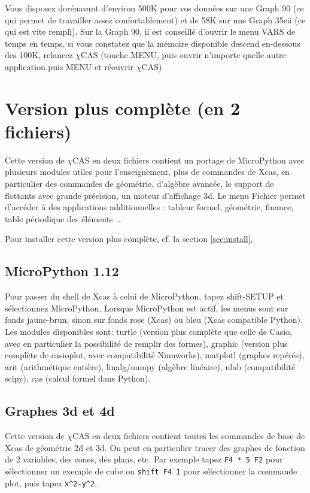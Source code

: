 \documentclass{article}
\begin{document}
\begin{giacjshere}
Vous disposez dor\'enavant d'environ 500K pour vos donn\'ees sur une Graph 90
(ce qui permet de travailler assez confortablement)
et de 58K sur une Graph 35eii (ce qui est vite rempli).
Sur la Graph 90, il est conseill\'e d'ouvrir le menu VARS de temps
en temps, si vous constatez que la m\'emoire disponible descend en-dessous
des 100K, relancez $\chi$CAS (touche MENU, puis ouvrir n'importe
quelle autre application puis MENU et r\'eouvrir $\chi$CAS).

\section{Version plus compl\`ete (en 2 fichiers)} \label{sec:2}
Cette version de $\chi$CAS en deux fichiers contient un portage de
MicroPython avec plusieurs modules utiles pour l'enseignement, plus de 
commandes de Xcas, en particulier des commandes de g\'eom\'etrie,
d'alg\`ebre avanc\'ee, le support de flottants avec grande
pr\'ecision, un moteur d'affichage 3d. Le menu Fichier permet d'acc\'eder
\`a des applications additionnelles : tableur formel, géométrie,
finance, table p\'eriodique des \'el\'ements ...

Pour installer cette version plus compl\`ete, cf. la section
\ref{sec:install}. 

\subsection{MicroPython 1.12}
Pour passer du shell de Xcas \`a celui de MicroPython, tapez
shift-SETUP et s\'electionnez MicroPython. 
Lorsque MicroPython est actif, les menus sont sur fonds
jaune-brun, sinon sur fonds rose (Xcas) ou bleu (Xcas compatible Python).
Les modules disponibles sont: turtle (version plus compl\`ete que
celle de Casio, avec en particulier la possibilit\'e de remplir des formes),
graphic (version plus compl\`ete de casioplot, avec compatibilit\'e
Numworks), matplotl (graphes rep\'er\'es), 
arit (arithm\'etique enti\`ere), linalg/numpy (alg\`ebre lin\'eaire),
ulab (compatibilit\'e scipy), cas (calcul formel dans Python).

\subsection{Graphes 3d et 4d}
Cette version de $\chi$CAS en deux fichiers contient 
toutes les commandes de base de Xcas de g\'eom\'etrie 2d et 3d. 
On peut en particulier tracer des graphes de fonction de 2 variables,
des cones, des plans, etc. Par exemple tapez 
\verb|F4 * 5 F2| pour s\'electionner un exemple de cube
ou \verb|shift F4 1| pour s\'electionner la commande plot,
puis tapez \verb|x^2-y^2|.


\end{giacjshere}
\end{document}
